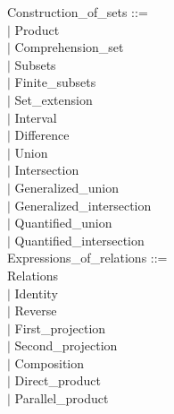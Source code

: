 \documentclass[12pt,a4paper,draft]{article}
\begin{document}
{\begin{sloppypar}
\noindent Construction\_of\_sets ::= \\
\hspace*{0.20in} $|$  Product\\
\hspace*{0.20in} $|$  Comprehension\_set\\
\hspace*{0.20in} $|$  Subsets\\
\hspace*{0.20in} $|$  Finite\_subsets\\
\hspace*{0.20in} $|$  Set\_extension\\
\hspace*{0.20in} $|$  Interval\\
\hspace*{0.20in} $|$  Difference\\
\hspace*{0.20in} $|$  Union\\
\hspace*{0.20in} $|$  Intersection\\
\hspace*{0.20in} $|$  Generalized\_union\\
\hspace*{0.20in} $|$  Generalized\_intersection\\
\hspace*{0.20in} $|$  Quantified\_union\\
\hspace*{0.20in} $|$  Quantified\_intersection\\
Expressions\_of\_relations ::= \\
\hspace*{0.20in}   Relations\\
\hspace*{0.20in} $|$  Identity\\
\hspace*{0.20in} $|$  Reverse\\
\hspace*{0.20in} $|$  First\_projection\\
\hspace*{0.20in} $|$  Second\_projection\\
\hspace*{0.20in} $|$  Composition\\
\hspace*{0.20in} $|$  Direct\_product\\
\hspace*{0.20in} $|$  Parallel\_product\\

\end{sloppypar}}
\end{document}
